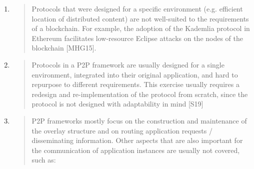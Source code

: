 \documentclass[]{article}
\begin{document}
\begin{enumerate}
\def\labelenumi{\arabic{enumi}.}
\item
  \begin{quote}
  Protocols that were designed for a specific environment (e.g.
  efficient location of distributed content) are not well-suited to the
  requirements of a blockchain. For example, the adoption of the
  Kademlia protocol in Ethereum facilitates low-resource Eclipse attacks
  on the nodes of the blockchain {[}MHG15{]}.
  \end{quote}
\item
  \begin{quote}
  Protocols in a P2P framework are usually designed for a single
  environment, integrated into their original application, and hard to
  repurpose to different requirements. This exercise usually requires a
  redesign and re-implementation of the protocol from scratch, since the
  protocol is not designed with adaptability in mind {[}S19{]}
  \end{quote}
\item
  \begin{quote}
  P2P frameworks mostly focus on the construction and maintenance of the
  overlay structure and on routing application requests / disseminating
  information. Other aspects that are also important for the
  communication of application instances are usually not covered, such
  as:
  \end{quote}


\end{enumerate}
\end{document}
